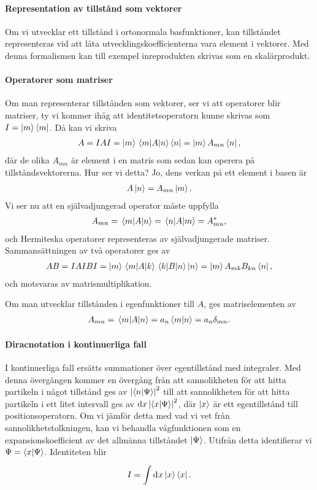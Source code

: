 \paragraph{Representation av tillstånd som vektorer}
Om vi utvecklar ett tillstånd i ortonormala basfunktioner, kan tillståndet representeras vid att låta utvecklingskoefficienterna vara element i vektorer. Med denna formalismen kan till exempel inreprodukten skrivas som en skalärprodukt.

\paragraph{Operatorer som matriser}
Om man representerar tillstånden som vektorer, ser vi att operatorer blir matriser, ty vi kommer ihåg att identitetsoperatorn kunne skrivas som $I = \ket{m}\bra{m}$. Då kan vi skriva
\begin{align*}
	A = IAI = \ket{m}\mel{m}{A}{n}\bra{n} = \ket{m}A_{mn}\bra{n},
\end{align*}
där de olika $A_{mn}$ är element i en matris som sedan kan operera på tillståndsvektorerna. Hur ser vi detta? Jo, dens verkan på ett element i basen är
\begin{align*}
	A\ket{n} = A_{mn}\ket{m}.
\end{align*}
Vi ser nu att en självadjungerad operator måste uppfylla
\begin{align*}
	A_{mn} = \mel{m}{A}{n} = \mel{n}{A}{m} = A_{mn}^{*},
\end{align*}
och Hermiteska operatorer representeras av självadjungerade matriser. Sammansättningen av två operatorer ges av
\begin{align*}
	AB = IAIBI = \ket{m}\mel{m}{A}{k}\mel{k}{B}{n}\ket{n} = \ket{m}A_{mk}B_{kn}\bra{n},
\end{align*}
och motsvaras av matrismultiplikation.

Om man utvecklar tillstånden i egenfunktioner till $A$, ges matriselementen av
\begin{align*}
	A_{mn} = \mel{m}{A}{n} = a_{n}\braket{m}{n} = a_{n}\delta_{mn}.
\end{align*}

\paragraph{Diracnotation i kontinuerliga fall}
I kontinuerliga fall ersätts summationer över egentillstånd med integraler. Med denna övergången kommer en övergång från att sannolikheten för att hitta partikeln i något tillstånd ges av $\abs{\braket{n}{\Psi}}^{2}$ till att sannolikheten för att hitta partikeln i ett litet intervall ges av $\dd{x}\abs{\braket{x}{\Psi}}^{2}$, där $\ket{x}$ är ett egentillstånd till positionsoperatorn. Om vi jämför detta med vad vi vet från sannolikhetstolkningen, kan vi behandla vågfunktionen som en expansionskoefficient av det allmänna tillståndet $\ket{\Psi}$. Utifrån detta identifierar vi $\Psi = \braket{x}{\Psi}$. Identiteten blir
\begin{align*}
	I = \int\limits_{}^{}\dd[]{x}\ket{x}\bra{x}.
\end{align*}

